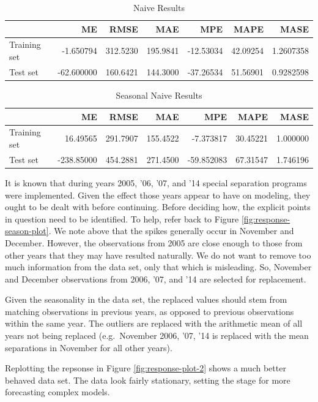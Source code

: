 \documentclass[12pt,letterpaper,toc=flat,oneside]{report}
\theoremstyle{definition}
\theoremstyle{definition}
\theoremstyle{definition}
\theoremstyle{remark}
\begin{document}
\begin{table}

\caption{\label{tab:n-err}Naive Results}
\centering
\begin{tabular}[t]{l|r|r|r|r|r|r}
\hline
  & ME & RMSE & MAE & MPE & MAPE & MASE\\
\hline
Training set & -1.650794 & 312.5230 & 195.9841 & -12.53034 & 42.09254 & 1.2607358\\
\hline
Test set & -62.600000 & 160.6421 & 144.3000 & -37.26534 & 51.56901 & 0.9282598\\
\hline
\end{tabular}
\end{table}\begin{table}

\caption{\label{tab:sn-err}Seasonal Naive Results}
\centering
\begin{tabular}[t]{l|r|r|r|r|r|r}
\hline
  & ME & RMSE & MAE & MPE & MAPE & MASE\\
\hline
Training set & 16.49565 & 291.7907 & 155.4522 & -7.373817 & 30.45221 & 1.000000\\
\hline
Test set & -238.85000 & 454.2881 & 271.4500 & -59.852083 & 67.31547 & 1.746196\\
\hline
\end{tabular}
\end{table}

It is known that during years 2005, '06, '07, and '14 special separation
programs were implemented. Given the effect those years appear to have
on modeling, they ought to be dealt with before continuing. Before
deciding how, the explicit points in question need to be identified. To
help, refer back to Figure \ref{fig:response-season-plot}. We note above
that the spikes generally occur in November and December. However, the
observations from 2005 are close enough to those from other years that
they may have resulted naturally. We do not want to remove too much
information from the data set, only that which is misleading. So,
November and December observations from 2006, '07, and '14 are selected
for replacement.

Given the seasonality in the data set, the replaced values should stem
from matching observations in previous years, as opposed to previous
observations within the same year. The outliers are replaced with the
arithmetic mean of all years not being replaced (e.g.~November 2006,
'07, '14 is replaced with the mean separations in November for all other
years).

Replotting the repsonse in Figure \ref{fig:response-plot-2} shows a much
better behaved data set. The data look fairly stationary, setting the
stage for more forecasting complex models.
\end{document}
